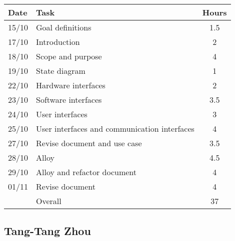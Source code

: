 \begin{table}[H]
\begin{tabularx}{\textwidth}{|l|X|c|}
\hline
\rowcolor[HTML]{C0C0C0} 
Date & Task & Hours\\ \hline
15/10 & Goal definitions & 1.5\\ \hline
17/10 & Introduction & 2\\ \hline
18/10 & Scope and purpose & 4\\ \hline
19/10 & State diagram & 1\\ \hline
22/10 & Hardware interfaces & 2\\ \hline 
23/10 & Software interfaces & 3.5\\ \hline
24/10 & User interfaces & 3\\ \hline
25/10 & User interfaces and communication interfaces & 4\\ \hline 
27/10 & Revise document and use case & 3.5\\ \hline
28/10 & Alloy & 4.5\\ \hline
29/10 & Alloy and refactor document & 4\\ \hline
01/11 & Revise document & 4 \\ \hline 
\rowcolor[HTML]{C0C0C0} 
& Overall & 37\\ \hline
\end{tabularx}
\end{table}

\subsection{Tang-Tang Zhou}

